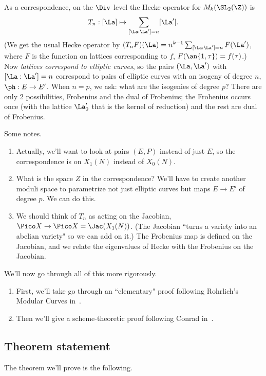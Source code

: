As a correspondence, on the $\Div$ level the Hecke operator for $M_k(\SL_2(\Z))$ is
\[
T_n:[\La]\mapsto \sum_{[\La:\La']=n}[\La'].
\]
(We get the usual Hecke operator by $(T_nF)(\La) =n^{k-1} \sum_{[\La:\La']=n} F(\La')$, where $F$ is the function on lattices corresponding to $f$, $F(\an{1,\tau})=f(\tau)$.) 
Now {\it lattices correspond to elliptic curves}, so the pairs $(\La,\La')$ with $[\La:\La']=n$ correspond to pairs of elliptic curves with an isogeny of degree $n$, $\ph:E\to E'$. When $n=p$, we ask: what are the isogenies of degree $p$? There are only 2 possibilities, Frobenius and the dual of Frobenius; the Frobenius occurs once (with the lattice $\La'_0$ that is the kernel of reduction) and the rest are dual of Frobenius.

Some notes.
\begin{enumerate}
\item
Actually, we'll want to look at pairs $(E,P)$ instead of just $E$, so the correspondence is on $X_1(N)$ instead of $X_0(N)$.
\item
What is the space $Z$ in the correspondence? We'll have to create another moduli space to parametrize not just elliptic curves but maps $E\to E'$ of degree $p$. We can do this.
\item
We should think of $T_n$ as acting on the Jacobian, $\Pico X\to \Pico X=\Jac(X_1(N))$. (The Jacobian ``turns a variety into an abelian variety" so we can add on it.) The Frobenius map is defined on the Jacobian, and we relate the eigenvalues of Hecke with the Frobenius on the Jacobian.
\end{enumerate}
We'll now go through all of this more rigorously. 
\begin{enumerate}
\item
First, we'll take go through an ``elementary" proof  following Rohrlich's Modular Curves in~\cite{CSS97}.
\item
Then we'll give a scheme-theoretic proof following Conrad in~\cite{Con}.
\end{enumerate}

\subsection{Theorem statement}

The theorem we'll prove is the following.


